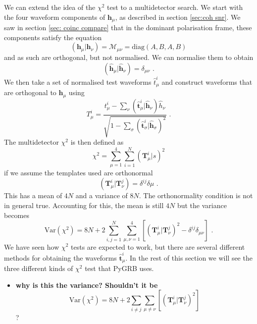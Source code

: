 \documentclass[11pt]{cuthesis}
\newcommand{\mn}{_{\mu\nu}}
\newcommand{\fs}{\text{ .}}
\begin{document}
We can extend the idea of the $\chi^2$ test to a multidetector search. We start with the four waveform components of $\textbf{h}_\mu$, as described in section \ref{sec:coh snr}. We saw in section \ref{sec: coinc compare} that in the dominant polarisation frame, these components satisfy the equation
\begin{equation}
( \textbf{h}_\mu | \textbf{h}_\nu ) = \mathcal{M}\mn = \text{diag}(A,B,A,B)
\end{equation}
and as such are orthogonal, but not normalised. We can normalise them to obtain 
\begin{equation}
(\hat{\textbf{h}}_\mu |\hat{\textbf{h}}_\nu ) = \delta\mn \fs
\end{equation}
We then take a set of normalised test waveforms $\hat{t}^i_\mu$ and construct waveforms that are orthogonal to $\hat{\textbf{h}}_\mu$ using
\begin{equation}
T^i_\mu = \frac{t^i_\mu - \sum_\nu(\hat{\textbf{t}}^i_\mu | \hat{\textbf{h}}_\nu)\hat{h}_\nu}{\sqrt{1-\sum_\sigma(\hat{\textbf{t}}^i_\sigma|\hat{\textbf{h}}_\sigma)^2}} \fs
\end{equation}
The multidetector $\chi^2$ is then defined as
\begin{equation}
\chi^2 = \sum_{\mu=1}^4 \sum_{i=1}^N (\textbf{T}^i_\mu | s)^2 
\end{equation}
if we assume the templates used are orthonormal
\begin{equation}
( \textbf{T}^i_\mu | \textbf{T}^j_\nu ) = \delta^{ij}\delta\mu \fs
\end{equation}
This has a mean of $4N$ and a variance of $8N$. The orthonormality condition is not in general true. Accounting for this, the mean is still $4N$ but the variance becomes
\begin{equation}
\text{Var}(\chi^2) = 8N + 2\sum_{i,j=1}^N \sum_{\mu,\nu=1}^4 [(\textbf{T}^i_\mu | \textbf{T}^j_\nu)^2 - \delta^{ij}\delta\mn ] \fs
\end{equation}
We have seen how $\chi^2$ tests are expected to work, but there are several different methods for obtaining the waveforms $\hat{\textbf{t}}^i_\mu$. In the rest of this section we will see the three different kinds of $\chi^2$ test that PyGRB uses.

\begin{itemize}
\item \textbf{why is this the variance? Shouldn't it be }
\begin{equation}
\text{Var}(\chi^2) = 8N + 2\sum_{i \neq j} \sum_{\mu\neq\nu} [(\textbf{T}^i_\mu | \textbf{T}^j_\nu)^2 ] 
\end{equation}
?
\end{itemize}
\end{document}
